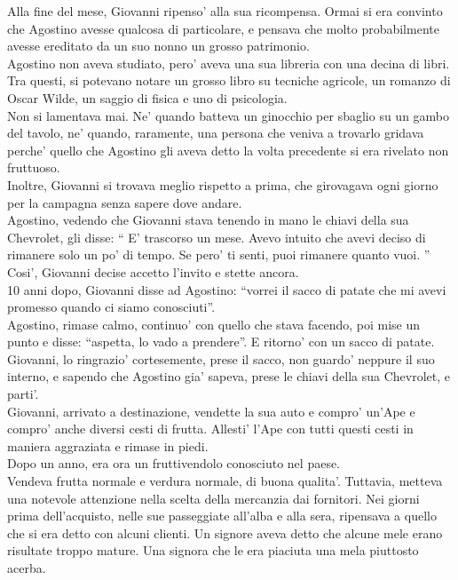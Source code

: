 Alla fine del mese, Giovanni ripenso' alla sua ricompensa. Ormai si era convinto che Agostino avesse qualcosa di particolare, e pensava che molto probabilmente avesse ereditato da un suo nonno un grosso patrimonio.\\
Agostino non aveva studiato, pero' aveva una sua libreria con una decina di libri. Tra questi, si potevano notare un grosso libro su tecniche agricole, un romanzo di Oscar Wilde, un saggio di fisica e uno di psicologia.\\
Non si lamentava mai. Ne' quando batteva un ginocchio per sbaglio su un gambo del tavolo, ne' quando, raramente, una persona che veniva a trovarlo gridava perche' quello che Agostino gli aveva detto la volta precedente si era rivelato non fruttuoso.\\
Inoltre, Giovanni si trovava meglio rispetto a prima, che girovagava ogni giorno per la campagna senza sapere dove andare.\\
Agostino, vedendo che Giovanni stava tenendo in mano le chiavi della sua Chevrolet, gli disse: \enquote{
E' trascorso un mese. Avevo intuito che avevi deciso di rimanere solo un po' di tempo. Se pero' ti senti, puoi rimanere quanto vuoi.
}
Cosi', Giovanni decise accetto l'invito e stette ancora.\\

10 anni dopo, Giovanni disse ad Agostino: \enquote{vorrei il sacco di patate che mi avevi promesso quando ci siamo conosciuti}.\\
Agostino, rimase calmo, continuo' con quello che stava facendo, poi mise un punto e disse: \enquote{aspetta, lo vado a prendere}. E ritorno' con un sacco di patate.\\
Giovanni, lo ringrazio' cortesemente, prese il sacco, non guardo' neppure il suo interno, e sapendo che Agostino gia' sapeva, prese le chiavi della sua Chevrolet, e parti'.\\

Giovanni, arrivato a destinazione, vendette la sua auto e compro' un'Ape e compro' anche diversi cesti di frutta. Allesti' l'Ape con tutti questi cesti in maniera aggraziata e rimase in piedi.\\

Dopo un anno, era ora un fruttivendolo conosciuto nel paese.\\
Vendeva frutta normale e verdura normale, di buona qualita'. Tuttavia, metteva una notevole attenzione nella scelta della mercanzia dai fornitori. Nei giorni prima dell'acquisto, nelle sue passeggiate all'alba e alla sera, ripensava a quello che si era detto con alcuni clienti. Un signore aveva detto che alcune mele erano risultate troppo mature. Una signora che le era piaciuta una mela piuttosto acerba.

